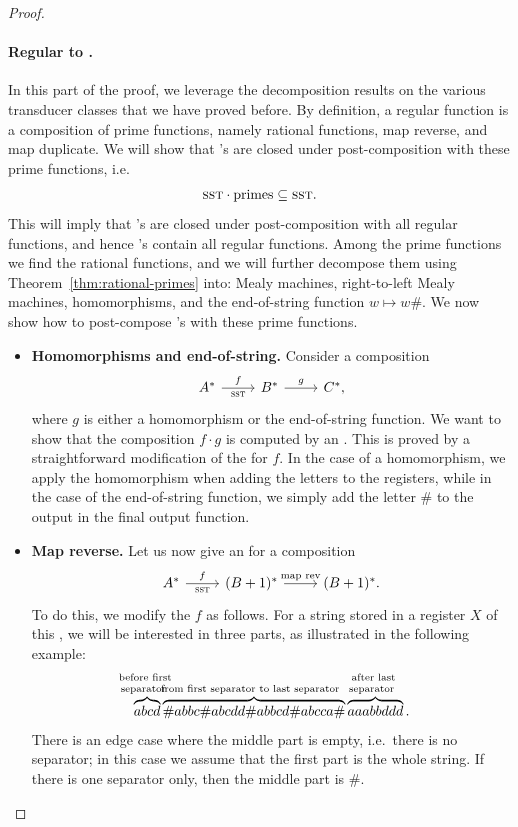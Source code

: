 \begin{proof}
\paragraph*{Regular to \sst.} In this part of the proof, we leverage the decomposition results on the various transducer classes that we have proved before. By definition,  a regular function is a composition of prime functions, namely rational functions, map reverse, and map duplicate. We will show  that \sst's are closed under post-composition with these prime functions, i.e.
\begin{align*}
{\textsc{sst}} \cdot \text{primes} \subseteq {\textsc{sst}}.
\end{align*}
This will imply that \sst's are closed under post-composition with all regular functions, and hence \sst's contain all regular functions.  Among the prime functions we find the rational functions, and we will further decompose them using Theorem~\ref{thm:rational-primes} into: Mealy machines, right-to-left Mealy machines, homomorphisms, and  the end-of-string function $w \mapsto w\#$. We now show how to post-compose \sst's with these prime functions.

\begin{itemize}
    \item \textbf{Homomorphisms and end-of-string.} Consider a composition 
    \[
    \begin{tikzcd}
    A^* \ar[r,"f","\text{\sst}"'] & B^* \ar[r,"g"] & C^*, 
    \end{tikzcd}
    \]
    where $g$ is either a homomorphism or the end-of-string function. We want to show that the composition $f \cdot g$ is computed by an \sst. This is proved by a straightforward modification of the \sst for $f$. In the case of a homomorphism, we  apply the homomorphism when adding the letters to the registers, while in the case of  the end-of-string function, we simply add the letter $\#$ to the output in the final output function. 
    \item \textbf{Map reverse.}  Let us now give an \sst for  a composition 
    \[
    \begin{tikzcd}
    A^* \ar[r,"f","\text{\sst}"'] & (B+1)^* \ar[r,"\text{map rev}"] & (B+1)^*.
    \end{tikzcd}
    \] 
To do this, we modify the \sst $f$ as follows. For a string stored in a register $X$ of this \sst, we will be interested in three parts, as illustrated in the following example:
\begin{align*}
\myoverbrace{abcd 
}{
    before first \\ separator
}
\myoverbrace{\#abbc\#abcdd\#abbcd\#abcca\#
}{
    from first separator  to last separator
}
\myoverbrace{aaabbddd}{
    after last\\ separator
}.
\end{align*}
There is an edge case where the middle part is empty, i.e.~there is no separator; in this case we assume that the first part is the whole string. If there is one separator only, then the middle part is $\#$. 


\end{itemize}
\end{proof}
